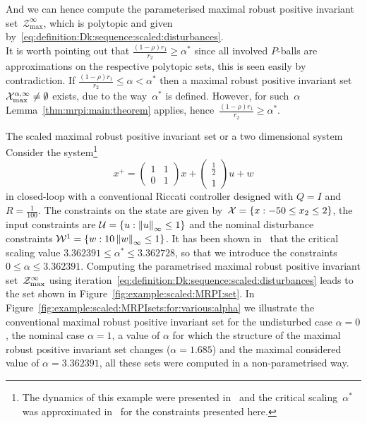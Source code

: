 %
\noindent And we can hence compute the parameterised maximal robust positive invariant set~$\mathcal Z^{\infty}_{\max}$, which is polytopic and given by~\eqref{eq:definition:Dk:sequence:scaled:disturbances}.
%
\\[1em]
%
It is worth pointing out that $\frac{(1-\rho)r_1}{r_2}\geq\alpha^\ast$ since all involved $P$-balls are approximations on the respective polytopic sets, this is seen easily by contradiction.
%
If $\frac{(1-\rho)r_1}{r_2}\leq\alpha<\alpha^\ast$ then a maximal robust positive invariant set~$\mathcal X^{\alpha,\infty}_{\max}\neq\emptyset$ exists, due to the way~$\alpha^\ast$ is defined.
%
However, for such~$\alpha$ Lemma~\ref{thm:mrpi:main:theorem} applies, hence~$\frac{(1-\rho)r_1}{r_2}\geq\alpha^\ast$.
%
\begin{example}{The scaled maximal robust positive invariant set or a two dimensional system}\label{example:MRPI:scaled:dist:set}
Consider the system\footnote{The dynamics of this example were presented in~\cite{Mayne:2005} and the critical scaling~$\alpha^\ast$ was approximated in~\cite{Schulze-Darup:2016} for the constraints presented here.}
%
\begin{equation}
	x^+ = \begin{pmatrix} 1 & 1 \\ 0 & 1 \end{pmatrix}x + \begin{pmatrix}\frac{1}{2}\\1\end{pmatrix}u +w
\end{equation}
%
in closed-loop with a conventional Riccati controller designed with $Q=I$ and $R=\frac{1}{100}$.
%
The constraints on the state are given by~$\mathcal X = \{x:-50\leq x_2\leq 2\}$, the input constraints are $\mathcal U=\{u:\left\|u\right\|_\infty\leq 1\}$ and the nominal disturbance constraints $\mathcal W^1 = \{w:10\left\|w\right\|_\infty\leq1\}$.
%
It has been shown in~\cite{Schulze-Darup:2016} that the critical scaling value $3.362391\leq\alpha^\ast\leq3.362728$, so that we introduce the constraints~$0\leq\alpha\leq3.362391$.
%
Computing the parametrised maximal robust positive invariant set~$\mathcal Z^\infty_{\max}$ using iteration~\eqref{eq:definition:Dk:sequence:scaled:disturbances} leads to the set shown in Figure~\ref{fig:example:scaled:MRPI:set}.
%
In Figure~\ref{fig:example:scaled:MRPIsets:for:various:alpha} we illustrate the conventional maximal robust positive invariant set for the undisturbed case $\alpha=0$, the nominal case $\alpha=1$, a value of $\alpha$ for which the structure of the maximal robust positive invariant set changes ($\alpha=1.685$) and the maximal considered value of $\alpha=3.362391$, all these sets were computed in a non-parametrised way.

\end{example}
